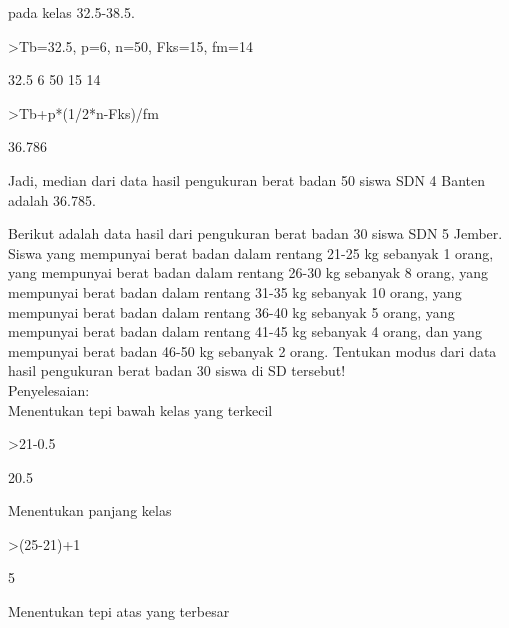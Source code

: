 \documentclass[a4paper,10pt]{article}
\begin{document}
\begin{eulernotebook}
\begin{eulercomment}
\begin{eulercomment}
\begin{eulercomment}
\begin{eulercomment}
\begin{eulercomment}
\begin{eulercomment}
\begin{eulercomment}
pada kelas 32.5-38.5.
\end{eulercomment}
\begin{eulerprompt}
>Tb=32.5, p=6, n=50, Fks=15, fm=14
\end{eulerprompt}
\begin{euleroutput}
  32.5
  6
  50
  15
  14
\end{euleroutput}
\begin{eulerprompt}
>Tb+p*(1/2*n-Fks)/fm
\end{eulerprompt}
\begin{euleroutput}
  36.786
\end{euleroutput}
\begin{eulercomment}
Jadi, median dari data hasil pengukuran berat badan 50 siswa SDN 4
Banten adalah 36.785.

\end{eulercomment}
\begin{eulercomment}
Berikut adalah data hasil dari pengukuran berat badan 30 siswa SDN 5
Jember. Siswa yang mempunyai berat badan dalam rentang 21-25 kg
sebanyak 1 orang, yang mempunyai berat badan dalam rentang 26-30 kg
sebanyak 8 orang, yang mempunyai berat badan dalam rentang 31-35 kg
sebanyak 10 orang, yang mempunyai berat badan dalam rentang 36-40 kg
sebanyak 5 orang, yang mempunyai berat badan dalam rentang 41-45 kg
sebanyak 4 orang, dan yang mempunyai berat badan 46-50 kg sebanyak 2
orang. Tentukan modus dari data hasil pengukuran berat badan 30 siswa
di SD tersebut!\\
Penyelesaian:\\
Menentukan tepi bawah kelas yang terkecil
\end{eulercomment}
\begin{eulerprompt}
>21-0.5
\end{eulerprompt}
\begin{euleroutput}
  20.5
\end{euleroutput}
\begin{eulercomment}
Menentukan panjang kelas
\end{eulercomment}
\begin{eulerprompt}
>(25-21)+1
\end{eulerprompt}
\begin{euleroutput}
  5
\end{euleroutput}
\begin{eulercomment}
Menentukan tepi atas yang terbesar
\end{eulercomment}
\begin{eulerprompt}

\end{eulerprompt}
\end{eulercomment}
\end{eulercomment}
\end{eulercomment}
\end{eulercomment}
\end{eulercomment}
\end{eulercomment}
\end{eulernotebook}
\end{document}
